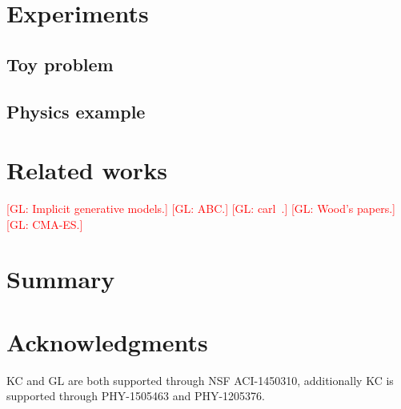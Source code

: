 \documentclass[twocolumn,superscriptaddress,aps]{revtex4-1}
\newcommand{\glnote}[1]{\textcolor{red}{[GL: #1]}}
\theoremstyle{plain}
\begin{document}
\section{Experiments}

\subsection{Toy problem}

\subsection{Physics example}



\section{Related works}


\glnote{Implicit generative models.}
\glnote{ABC.}
\glnote{carl~\citep{cranmer2015approximating}.}
\glnote{Wood's papers.}
\glnote{CMA-ES.}



\section{Summary}




\section*{Acknowledgments}

KC and GL are both supported through NSF ACI-1450310, additionally KC is
supported through PHY-1505463 and PHY-1205376.





\end{document}
